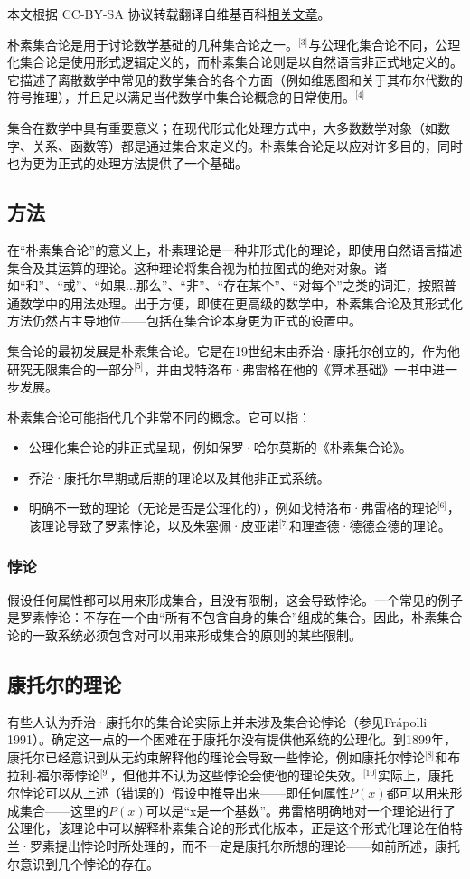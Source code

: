 
本文根据 CC-BY-SA 协议转载翻译自维基百科\href{https://en.wikipedia.org/wiki/Naive_set_theory}{相关文章}。

朴素集合论是用于讨论数学基础的几种集合论之一。\(^\text{[3]}\)与公理化集合论不同，公理化集合论是使用形式逻辑定义的，而朴素集合论则是以自然语言非正式地定义的。它描述了离散数学中常见的数学集合的各个方面（例如维恩图和关于其布尔代数的符号推理），并且足以满足当代数学中集合论概念的日常使用。\(^\text{[4]}\)

集合在数学中具有重要意义；在现代形式化处理方式中，大多数数学对象（如数字、关系、函数等）都是通过集合来定义的。朴素集合论足以应对许多目的，同时也为更为正式的处理方法提供了一个基础。
\subsection{方法}  
在“朴素集合论”的意义上，朴素理论是一种非形式化的理论，即使用自然语言描述集合及其运算的理论。这种理论将集合视为柏拉图式的绝对对象。诸如“和”、“或”、“如果...那么”、“非”、“存在某个”、“对每个”之类的词汇，按照普通数学中的用法处理。出于方便，即使在更高级的数学中，朴素集合论及其形式化方法仍然占主导地位——包括在集合论本身更为正式的设置中。

集合论的最初发展是朴素集合论。它是在19世纪末由乔治·康托尔创立的，作为他研究无限集合的一部分\(^\text{[5]}\)，并由戈特洛布·弗雷格在他的《算术基础》一书中进一步发展。

朴素集合论可能指代几个非常不同的概念。它可以指：
\begin{itemize}
\item 公理化集合论的非正式呈现，例如保罗·哈尔莫斯的《朴素集合论》。
\item 乔治·康托尔早期或后期的理论以及其他非正式系统。
\item 明确不一致的理论（无论是否是公理化的），例如戈特洛布·弗雷格的理论\(^\text{[6]}\)，该理论导致了罗素悖论，以及朱塞佩·皮亚诺\(^\text{[7]}\)和理查德·德德金德的理论。
\end{itemize}
\subsubsection{悖论}  
假设任何属性都可以用来形成集合，且没有限制，这会导致悖论。一个常见的例子是罗素悖论：不存在一个由“所有不包含自身的集合”组成的集合。因此，朴素集合论的一致系统必须包含对可以用来形成集合的原则的某些限制。
\subsection{康托尔的理论}  
有些人认为乔治·康托尔的集合论实际上并未涉及集合论悖论（参见Frápolli 1991）。确定这一点的一个困难在于康托尔没有提供他系统的公理化。到1899年，康托尔已经意识到从无约束解释他的理论会导致一些悖论，例如康托尔悖论\(^\text{[8]}\)和布拉利-福尔蒂悖论\(^\text{[9]}\)，但他并不认为这些悖论会使他的理论失效。\(^\text{[10]}\)实际上，康托尔悖论可以从上述（错误的）假设中推导出来——即任何属性\(P(x)\)都可以用来形成集合——这里的\(P(x)\)可以是“x是一个基数”。弗雷格明确地对一个理论进行了公理化，该理论中可以解释朴素集合论的形式化版本，正是这个形式化理论在伯特兰·罗素提出悖论时所处理的，而不一定是康托尔所想的理论——如前所述，康托尔意识到几个悖论的存在。
